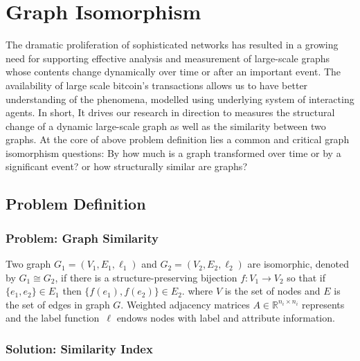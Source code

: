\chapter{Graph Isomorphism} %

\label{Chapter3} %


The dramatic proliferation of sophisticated networks has resulted in a growing need for supporting effective analysis and measurement of large-scale graphs whose contents change dynamically over time or after
an important event. The availability of large scale bitcoin's transactions allows us to have better understanding of the phenomena, modelled using underlying system of interacting agents. In short, It drives our research in direction to measures the structural change of a dynamic large-scale graph as well as the similarity between two graphs. At the core of above problem definition lies a common and critical graph isomorphism questions: By how much is a graph transformed over time or by a significant event? or how structurally similar are graphs?

\section{Problem Definition}

\subsection{Problem: Graph Similarity}

Two graph $G_{1} = (V_{1},E_{1},\ell_{1})$ and $G_{2} = (V_{2},E_{2},\ell_{2})$ are isomorphic, denoted by $G_{1} \cong G_{2}$, if there is a structure-preserving bijection $f \colon V_{1} \rightarrow V_{2}$ so that if $ \{ e_{1}, e_{2} \} \in E_{1}$ then $ \{ f(e_{1}), f(e_{2}) \} \in E_{2}$.  where $V$ is the set of nodes and $E$ is the set of edges in graph $G$. Weighted adjacency matrices $A \in \mathbb{R}^{n_i \times n_i}$ represents and the label function~$\ell$ endows nodes with label and attribute information.

\subsection{Solution: Similarity Index}

